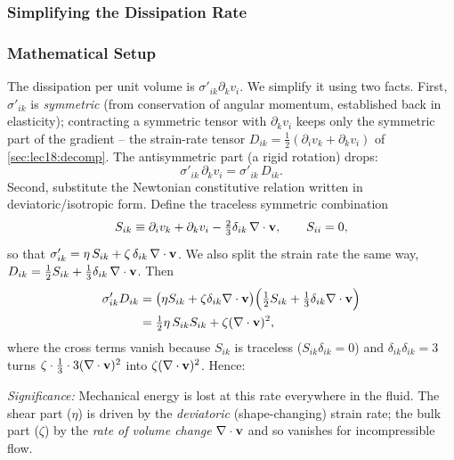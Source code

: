 \documentclass[../main.tex]{subfiles}
\begin{document}
\subsubsection{Simplifying the Dissipation Rate}\label{sec:lec19:dissipation_simplify}

\subsubsection*{Mathematical Setup}
The dissipation per unit volume is $\sigma'_{ik}\partial_k v_i$. We simplify it using two facts. First, $\sigma'_{ik}$ is \emph{symmetric} (from conservation of angular momentum, established back in elasticity); contracting a symmetric tensor with $\partial_k v_i$ keeps only the symmetric part of the gradient -- the strain-rate tensor $D_{ik}=\tfrac12(\partial_i v_k+\partial_k v_i)$ of \cref{sec:lec18:decomp}. The antisymmetric part (a rigid rotation) drops:
\begin{equation}
  \sigma'_{ik}\,\partial_k v_i = \sigma'_{ik}\,D_{ik}.
  \label{eq:lec19_diss_sym}
\end{equation}
Second, substitute the Newtonian constitutive relation written in deviatoric/isotropic form. Define the traceless symmetric combination
\begin{equation}
  S_{ik}\equiv \partial_i v_k+\partial_k v_i-\tfrac23\delta_{ik}\,\nabla \cdot\mathbf{v},
  \qquad S_{ii}=0,
  \label{eq:lec19_Sdef}
\end{equation}
so that $\sigma'_{ik}=\eta\,S_{ik}+\zeta\,\delta_{ik}\,\nabla \cdot\mathbf{v}$. We also split the strain rate the same way, $D_{ik}=\tfrac12 S_{ik}+\tfrac13\delta_{ik}\,\nabla \cdot\mathbf{v}$. Then
\begin{align}
  \sigma'_{ik}D_{ik}
    &= \big(\eta S_{ik}+\zeta\delta_{ik}\nabla \cdot\mathbf{v}\big)\Big(\tfrac12 S_{ik}+\tfrac13\delta_{ik}\nabla \cdot\mathbf{v}\Big) \notag\\
    &= \tfrac12\eta\,S_{ik}S_{ik} + \zeta(\nabla \cdot\mathbf{v})^2 ,
  \label{eq:lec19_diss_expand}
\end{align}
where the cross terms vanish because $S_{ik}$ is traceless ($S_{ik}\delta_{ik}=0$) and $\delta_{ik}\delta_{ik}=3$ turns $\zeta\cdot\tfrac13\cdot3(\nabla \cdot\mathbf{v})^2$ into $\zeta(\nabla \cdot\mathbf{v})^2$. Hence:

\textit{Significance:} Mechanical energy is lost at this rate everywhere in the fluid. The shear part ($\eta$) is driven by the \emph{deviatoric} (shape-changing) strain rate; the bulk part ($\zeta$) by the \emph{rate of volume change} $\nabla \cdot\mathbf{v}$ and so vanishes for incompressible flow.
\end{document}
